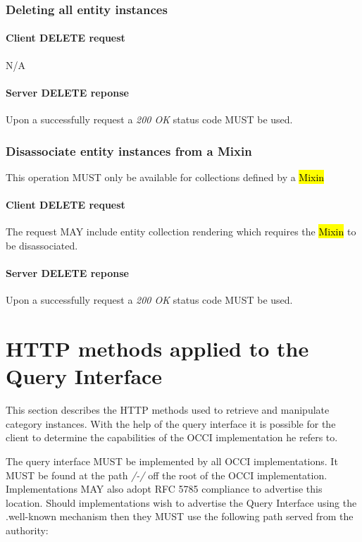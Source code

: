 \documentclass[10pt,a4paper]{article}
\begin{document}
\subsubsection{Deleting all entity instances}

\paragraph{Client DELETE request}
N/A

\paragraph{Server DELETE reponse}
Upon a successfully request a \emph{200 OK} status code MUST be used.

\subsubsection{Disassociate entity instances from a Mixin}
This operation MUST only be available for collections defined by a \hl{Mixin}

\paragraph{Client DELETE request}
The request MAY include entity collection rendering which requires the \hl{Mixin} to be disassociated.

\paragraph{Server DELETE reponse}
Upon a successfully request a \emph{200 OK} status code MUST be used.

\section{HTTP methods applied to the Query Interface}
This section describes the HTTP methods used to retrieve and manipulate category instances.  With the help of the query interface it is possible for the client to determine the capabilities of the OCCI implementation he refers to.

The query interface MUST be implemented by all OCCI implementations. It MUST be found at the path \emph{/-/} off the root of the OCCI implementation. Implementations MAY also adopt RFC 5785 \cite{rfc5785} compliance to advertise this location. Should implementations wish to advertise the Query Interface using the .well-known mechanism then they MUST use the following path served from the authority:
\end{document}
